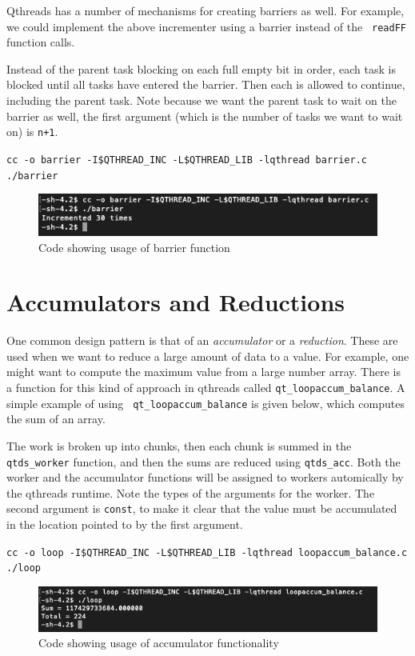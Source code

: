 \documentclass[12pt,fullpage]{article}
\begin{document}
Qthreads has a number of mechanisms for creating barriers as well. For example,
we could implement the above incrementer using a barrier instead of the {\tt
readFF} function calls.

Instead of the parent task blocking on each full empty bit in order, each task
is blocked until all tasks have entered the barrier. Then each is allowed to
continue, including the parent task. Note because we want the parent task to
wait on the barrier as well, the first argument (which is the number of tasks we
want to wait on) is {\tt n+1}.

\newpage

{\footnotesize{\tt cc -o barrier -I\$QTHREAD\_INC -L\$QTHREAD\_LIB -lqthread barrier.c}}
\\
{\footnotesize{\tt ./barrier}}
\begin{figure}[h]
\includegraphics[scale=0.85]{barrier.png}
\caption{Code showing usage of barrier function}
\end{figure}

\newpage
\section{Accumulators and Reductions}
One common design pattern is that of an \emph{accumulator} or a
\emph{reduction}. These are used when we want to reduce a large amount of data
to a value. For example, one might want to compute the maximum value from a
large number array. There is a function for this kind of approach in qthreads
called {\tt qt\_loopaccum\_balance}. A simple example of using {\tt
qt\_loopaccum\_balance} is given below, which computes the sum of an array.

The work is broken up into chunks, then each chunk is summed in the {\tt
qtds\_worker} function, and then the sums are reduced using {\tt qtds\_acc}.
Both the worker and the accumulator functions will be assigned to workers
automically by the qthreads runtime. Note the types of the arguments for the
worker. The second argument is {\tt const}, to make it clear that the value must
be accumulated in the location pointed to by the first argument. 


{\footnotesize{\tt cc -o loop -I\$QTHREAD\_INC -L\$QTHREAD\_LIB -lqthread loopaccum\_balance.c}}
\\
{\footnotesize{\tt ./loop}}
\\
\begin{figure}[h]
\includegraphics[scale=0.95]{loopaccum_balance.png}
\caption{Code showing usage of accumulator functionality}
\end{figure}
\end{document}
